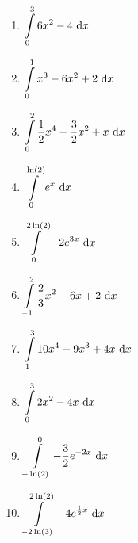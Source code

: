 \vspace{-.5cm}

\begin{Exercise}[title={\raggedright\normalfont Berechne die Werte der folgenden Integrale:}, label=integralRechnA2]

	\begin{minipage}{\textwidth}
		\begin{minipage}{.5\textwidth}
			\begin{enumerate}[label=\alph*)]
				\item \(\displaystyle\int\limits_{0}^{3} 6x^2- 4\ \text{d} x\)
				\item \(\displaystyle\int\limits_{0}^{1} x^3-6x^2+2 \ \text{d} x\)
				\item \(\displaystyle\int\limits_{0}^{2} \frac{1}{2}x^4-\frac{3}{2}x^2+x \ \text{d} x\)
				\item \(\displaystyle\int\limits_{0}^{\ln(2)} e^x \ \text{d} x\)
				\item \(\displaystyle\int\limits_{0}^{2\ln(2)} -2e^{3x} \ \text{d} x\)
			\end{enumerate}
		\end{minipage}%
		\begin{minipage}{.5\textwidth}
			\begin{enumerate}[label=\alph*)]
				\setcounter{enumi}{5}
				\item \(\displaystyle\int\limits_{-1}^{2} \frac{2}{3}x^2-6x+2 \ \text{d} x\)
				\item \(\displaystyle\int\limits_{1}^{3} 10x^4-9x^3+4x \ \text{d} x\)
				\item \(\displaystyle\int\limits_{0}^{3} 2x^2-4x \ \text{d} x\)
				\item \(\displaystyle\int\limits_{-\ln(2)}^{0} -\frac{3}{2}e^{-2x} \ \text{d} x\)
				\item \(\displaystyle\int\limits_{-2\ln(3)}^{2\ln(2)} -4e^{\frac{1}{2}x} \ \text{d} x\)
			\end{enumerate}
		\end{minipage}%
	\end{minipage}

\end{Exercise}
